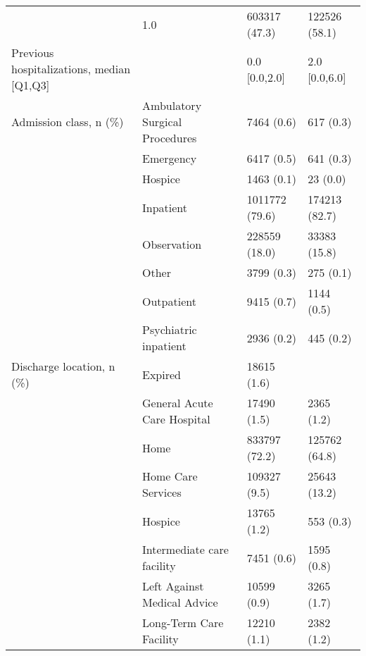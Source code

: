 \begin{tabular}{llll}
                                       & 1.0 &                  603317 (47.3) &      122526 (58.1) \\
Previous hospitalizations, median [Q1,Q3] &   &                  0.0 [0.0,2.0] &      2.0 [0.0,6.0] \\
Admission class, n (\%) & Ambulatory Surgical Procedures &                     7464 (0.6) &          617 (0.3) \\
                                       & Emergency &                     6417 (0.5) &          641 (0.3) \\
                                       & Hospice &                     1463 (0.1) &           23 (0.0) \\
                                       & Inpatient &                 1011772 (79.6) &      174213 (82.7) \\
                                       & Observation &                  228559 (18.0) &       33383 (15.8) \\
                                       & Other &                     3799 (0.3) &          275 (0.1) \\
                                       & Outpatient &                     9415 (0.7) &         1144 (0.5) \\
                                       & Psychiatric inpatient &                     2936 (0.2) &          445 (0.2) \\
Discharge location, n (\%) & Expired &                    18615 (1.6) &                    \\
                                       & General Acute Care Hospital &                    17490 (1.5) &         2365 (1.2) \\
                                       & Home &                  833797 (72.2) &      125762 (64.8) \\
                                       & Home Care Services &                   109327 (9.5) &       25643 (13.2) \\
                                       & Hospice &                    13765 (1.2) &          553 (0.3) \\
                                       & Intermediate care facility &                     7451 (0.6) &         1595 (0.8) \\
                                       & Left Against Medical Advice &                    10599 (0.9) &         3265 (1.7) \\
                                       & Long-Term Care Facility &                    12210 (1.1) &         2382 (1.2) \\

\end{tabular}

